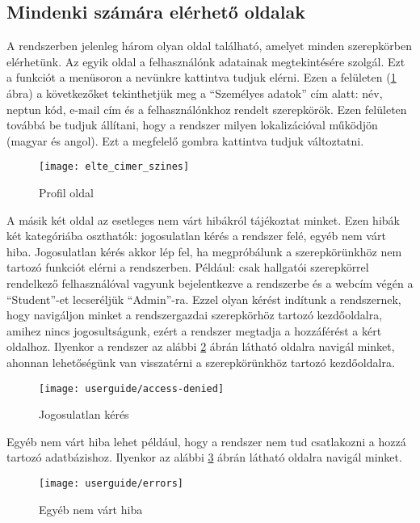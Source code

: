 \subsection{Mindenki számára elérhető oldalak}
\label{step:mindenkinek-elerheto-oldal}
A rendszerben jelenleg három olyan oldal található, amelyet minden szerepkörben elérhetünk. Az egyik oldal a felhasználónk adatainak megtekintésére szolgál. Ezt a funkciót a menüsoron a nevünkre kattintva tudjuk elérni. Ezen a felületen (\ref{fig:profile} ábra) a következőket tekinthetjük meg a ``Személyes adatok'' cím alatt: név, neptun kód, e-mail cím és a felhasználónkhoz rendelt szerepkörök. Ezen felületen továbbá be tudjuk állítani, hogy a rendszer milyen lokalizációval működjön (magyar és angol). Ezt a megfelelő gombra kattintva tudjuk változtatni.
\begin{figure}[H]
	\centering
	\texttt{[image: elte\_cimer\_szines]}
	\caption{Profil oldal}
	\label{fig:profile}
\end{figure}
A másik két oldal az esetleges nem várt hibákról tájékoztat minket. Ezen hibák két kategóriába oszthatók: jogosulatlan kérés a rendszer felé, egyéb nem várt hiba. Jogosulatlan kérés akkor lép fel, ha megpróbálunk a szerepkörünkhöz nem tartozó funkciót elérni a rendszerben. Például: csak hallgatói szerepkörrel rendelkező felhasználóval vagyunk bejelentkezve a rendszerbe és a webcím végén a ``Student''-et lecseréljük ``Admin''-ra. Ezzel olyan kérést indítunk a rendszernek, hogy navigáljon minket a rendszergazdai szerepkörhöz tartozó kezdőoldalra, amihez nincs jogosultságunk, ezért a rendszer megtadja a hozzáférést a kért oldalhoz. Ilyenkor a rendszer az alábbi \ref{fig:access-denied} ábrán látható oldalra navigál minket, ahonnan lehetőségünk van visszatérni a szerepkörünkhöz tartozó kezdőoldalra.
\begin{figure}[H]
	\centering
	\texttt{[image: userguide/access-denied]}
	\caption{Jogosulatlan kérés}
	\label{fig:access-denied}
\end{figure}
Egyéb nem várt hiba lehet például, hogy a rendszer nem tud csatlakozni a hozzá tartozó adatbázishoz. Ilyenkor az alábbi \ref{fig:errors} ábrán látható oldalra navigál minket.
\begin{figure}[H]
	\centering
	\texttt{[image: userguide/errors]}
	\caption{Egyéb nem várt hiba}
	\label{fig:errors}
\end{figure}